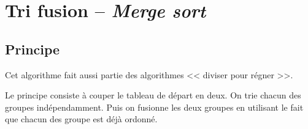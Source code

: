 %
%
\section{Tri fusion -- \textit{Merge sort}}

\subsection{Principe}


Cet algorithme fait aussi partie des algorithmes << diviser pour régner >>.

Le principe consiste à couper le tableau de départ en deux. On trie chacun des groupes indépendamment. Puis on fusionne les deux groupes en utilisant le fait que chacun des groupe est déjà ordonné.

